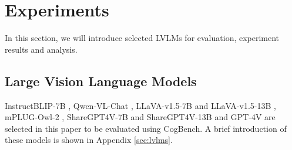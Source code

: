 \section{Experiments}

In this section, we will introduce selected LVLMs for evaluation, experiment results and  analysis. 

\subsection{Large Vision Language Models}

InstructBLIP-7B \cite{dai2023instructblip}, Qwen-VL-Chat \cite{bai2023qwenvl}, LLaVA-v1.5-7B and LLaVA-v1.5-13B \cite{liu2023improved}, mPLUG-Owl-2 \cite{ye2023mplug}, ShareGPT4V-7B and ShareGPT4V-13B \cite{chen2023sharegpt4v} and GPT-4V \cite{openai2023gpt4} are selected in this paper to be evaluated using CogBench.
A brief introduction of these models is shown in Appendix \ref{sec:lvlms}.


